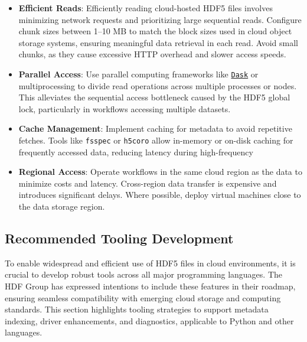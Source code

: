 \documentclass[
]{agujournal2019}
\providecommand{\tightlist}{%
  \setlength{\itemsep}{0pt}\setlength{\parskip}{0pt}}
\begin{document}
\begin{itemize}
\tightlist
\item
  \textbf{Efficient Reads}: Efficiently reading cloud-hosted HDF5 files
  involves minimizing network requests and prioritizing large sequential
  reads. Configure chunk sizes between 1--10 MB to match the block sizes
  used in cloud object storage systems, ensuring meaningful data
  retrieval in each read. Avoid small chunks, as they cause excessive
  HTTP overhead and slower access speeds.
\item
  \textbf{Parallel Access}: Use parallel computing frameworks like
  \href{https://www.dask.org/}{\texttt{Dask}} or multiprocessing to
  divide read operations across multiple processes or nodes. This
  alleviates the sequential access bottleneck caused by the HDF5 global
  lock, particularly in workflows accessing multiple datasets.
\item
  \textbf{Cache Management}: Implement caching for metadata to avoid
  repetitive fetches. Tools like \texttt{fsspec} or \texttt{h5coro}
  allow in-memory or on-disk caching for frequently accessed data,
  reducing latency during high-frequency
\item
  \textbf{Regional Access}: Operate workflows in the same cloud region
  as the data to minimize costs and latency. Cross-region data transfer
  is expensive and introduces significant delays. Where possible, deploy
  virtual machines close to the data storage region.
\end{itemize}

\subsection{Recommended Tooling
Development}\label{recommended-tooling-development}

To enable widespread and efficient use of HDF5 files in cloud
environments, it is crucial to develop robust tools across all major
programming languages. The HDF Group has expressed intentions to include
these features in their roadmap, ensuring seamless compatibility with
emerging cloud storage and computing standards. This section highlights
tooling strategies to support metadata indexing, driver enhancements,
and diagnostics, applicable to Python and other languages.
\end{document}
